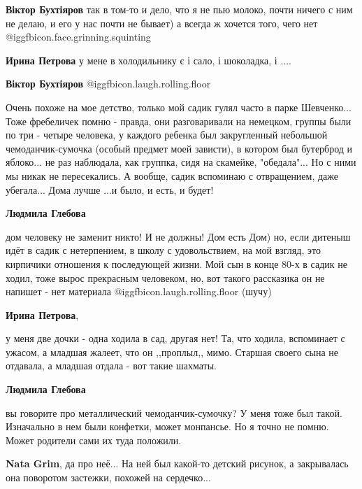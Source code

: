 \begin{itemize}
\begin{itemize}
\textbf{Віктор Бухтіяров} так в том-то и дело, что я не пью молоко, почти ничего с ним не делаю, и его у нас почти не бывает) а всегда ж хочется того, чего нет @igg{fbicon.face.grinning.squinting} 

\textbf{Ирина Петрова} у мене в холодильнику є і сало, і шоколадка, і ....

\textbf{Віктор Бухтіяров}  @igg{fbicon.laugh.rolling.floor} 

\end{itemize} %


Очень похоже на мое детство, только мой садик гулял часто в парке Шевченко...
Тоже фребеличек помню - правда, они разговаривали на немецком, группы были по
три - четыре человека, у каждого ребенка был закругленный небольшой
чемоданчик-сумочка (особый предмет моей зависти), в котором был бутерброд и
яблоко... не раз наблюдала, как группка, сидя на скамейке, "обедала"... Но с
ними мы никак не пересекались. А вообще, садик вспоминаю с отвращением, даже
убегала... Дома лучше ...и было, и есть, и будет!

\begin{itemize} %
\textbf{Людмила Глебова} 

дом человеку не заменит никто! И не должны! Дом есть Дом) но, если дитеныш идёт
в садик с нетерпением, в школу с удовольствием, на мой взгляд, это кирпичики
отношения к последующей жизни. Мой сын в конце 80-х в садик не ходил, тоже
вырос прекрасным человеком, но, вот такого рассказика он не напишет - нет
материала @igg{fbicon.laugh.rolling.floor}  (шучу)

\begin{itemize} %
\textbf{Ирина Петрова}, 

у меня две дочки - одна ходила в сад, другая нет! Та, что ходила, вспоминает с
ужасом, а младшая жалеет, что он ,,проплыл,, мимо. Старшая своего сына не
отдавала, а младшая отдала - вот такие шахматы.

\end{itemize} %

\textbf{Людмила Глебова} 

вы говорите про металлический чемоданчик-сумочку? У меня тоже был такой.
Изначально в нем были конфетки, может монпансье. Но я точно не помню. Может
родители сами их туда положили.

\begin{itemize} %
\textbf{Nata Grim}, да про неё... На ней был какой-то детский рисунок, а закрывалась она поворотом застежки, похожей на сердечко...


\end{itemize}
\end{itemize}
\end{itemize}
